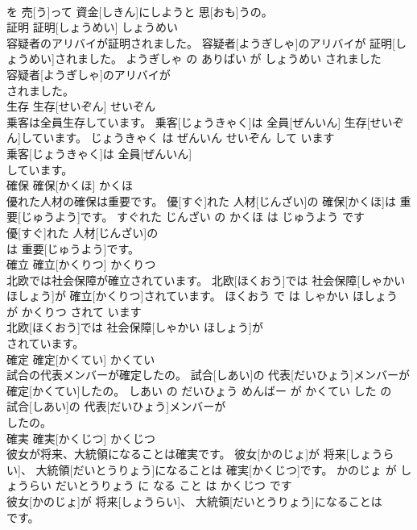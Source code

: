 \documentclass[8pt]{extreport}
\begin{document}
\begin{CJK}{UTF8}{min}
\\	を 売[う]って 資金[しきん]にしようと 思[おも]うの。			
\\	証明	証明[しょうめい]	しょうめい	
\\	容疑者のアリバイが証明されました。	容疑者[ようぎしゃ]のアリバイが 証明[しょうめい]されました。	ようぎしゃ の ありばい が しょうめい されました	
\\	容疑者[ようぎしゃ]のアリバイが
\\	されました。			
\\	生存	生存[せいぞん]	せいぞん	
\\	乗客は全員生存しています。	乗客[じょうきゃく]は 全員[ぜんいん] 生存[せいぞん]しています。	じょうきゃく は ぜんいん せいぞん して います	
\\	乗客[じょうきゃく]は 全員[ぜんいん]
\\	しています。			
\\	確保	確保[かくほ]	かくほ	
\\	優れた人材の確保は重要です。	優[すぐ]れた 人材[じんざい]の 確保[かくほ]は 重要[じゅうよう]です。	すぐれた じんざい の かくほ は じゅうよう です	
\\	優[すぐ]れた 人材[じんざい]の
\\	は 重要[じゅうよう]です。			
\\	確立	確立[かくりつ]	かくりつ	
\\	北欧では社会保障が確立されています。	北欧[ほくおう]では 社会保障[しゃかい ほしょう]が 確立[かくりつ]されています。	ほくおう で は しゃかい ほしょう が かくりつ されて います	
\\	北欧[ほくおう]では 社会保障[しゃかい ほしょう]が
\\	されています。			
\\	確定	確定[かくてい]	かくてい	
\\	試合の代表メンバーが確定したの。	試合[しあい]の 代表[だいひょう]メンバーが 確定[かくてい]したの。	しあい の だいひょう めんばー が かくてい した の	
\\	試合[しあい]の 代表[だいひょう]メンバーが
\\	したの。			
\\	確実	確実[かくじつ]	かくじつ	
\\	彼女が将来、大統領になることは確実です。	彼女[かのじょ]が 将来[しょうらい]、 大統領[だいとうりょう]になることは 確実[かくじつ]です。	かのじょ が しょうらい だいとうりょう に なる こと は かくじつ です	
\\	彼女[かのじょ]が 将来[しょうらい]、 大統領[だいとうりょう]になることは
\\	です。			

\end{CJK}
\end{document}
